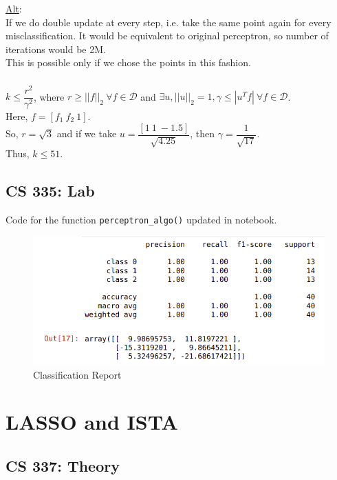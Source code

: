 \documentclass[12pt, fleqn]{article}
\begin{document}
\underline{Alt}: \\
If we do double update at every step, i.e. take the same point again for every misclassification. It would be equivalent to original perceptron, so number of iterations would be 2M. \\
This is possible only if we chose the points in this fashion.

\subsubsection{}
$k \le \dfrac{r^2}{\gamma^2}$, where $r \ge ||f||_2 \ \forall f \in \mathcal{D}$ and $\exists u, ||u||_2 = 1, \gamma \le |u^T f| \ \forall f \in \mathcal{D}$. \\
Here, $f = [f_1 \ f_2 \ 1]$. \\
So, $r = \sqrt{3}$ and if we take $u = \dfrac{[1 \ 1 \ -1.5]}{\sqrt{4.25}}$, then $\gamma = \dfrac{1}{\sqrt{17}}$. \\
Thus, $k \le 51$.

\subsection{CS 335: Lab}
Code for the function \verb!perceptron_algo()! updated in notebook.
\begin{figure}[H]
  \centering
  \includegraphics[scale=0.5]{perceptron_classification_report.png}
  \caption{Classification Report}
\end{figure}


\newpage
\section{LASSO and ISTA}
\subsection{CS 337: Theory}
\end{document}
